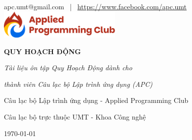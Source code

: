 \begin{titlepage}
\thispagestyle{empty}
\centering

\vspace*{1cm}

{\large apc.umt@gmail.com \, | \, \url{https://www.facebook.com/apc.umt}}\\[1cm]

\includegraphics[width=6cm]{../resource/img/logo.png}\\[3.5cm]
{\fontsize{36}{40}\selectfont\bfseries QUY HOẠCH ĐỘNG\par} 
\vspace{0.6cm}
{\fontsize{18}{22}\selectfont\itshape Tài liệu ôn tập Quy Hoạch Động dành cho \par}
{\fontsize{18}{22}\selectfont\itshape thành viên Câu lạc bộ Lập trình ứng dụng (APC)\par}
\vspace{5cm}

{\Large Câu lạc bộ Lập trình ứng dụng - Applied Programming Club\par}
\vspace{0.4cm}
{\large Câu lạc bộ trực thuộc UMT - Khoa Công nghệ\par}

\vspace{8cm}

{\Large \today\par}

\vfill
\end{titlepage}
